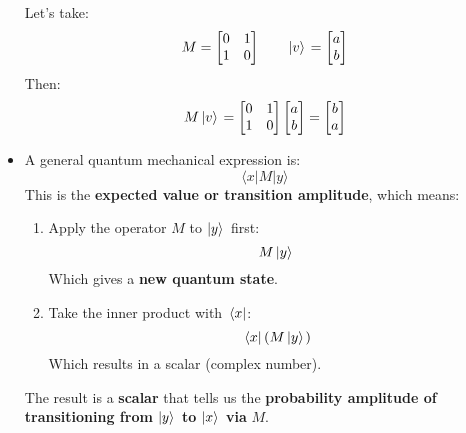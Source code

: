 \begin{itemize}
    \begin{examplebox}
        Let's take:
        \begin{equation*}
            M = \begin{bmatrix}
                0 & 1 \\ 1 & 0
            \end{bmatrix}
            \hspace{2em}
            \left| v \rangle\right. = \begin{bmatrix}
                a \\ b
            \end{bmatrix}
        \end{equation*}
        Then:
        \begin{equation*}
            M \left| v \rangle\right. = \begin{bmatrix}
                0 & 1 \\ 1 & 0
            \end{bmatrix}
            \begin{bmatrix}
                a \\ b
            \end{bmatrix}
            =
            \begin{bmatrix}
                b \\ a
            \end{bmatrix}
        \end{equation*}
    \end{examplebox}


    \item {}

    A general quantum mechanical expression is:
    \begin{equation*}
        \langle x | M | y \rangle
    \end{equation*}  
    This is the \textbf{expected value or transition amplitude}, which means:
    \begin{enumerate}
        \item Apply the operator $M$ to $\left| y \rangle\right.$ first:  
        \begin{equation*}
            M \left| y \rangle\right.
        \end{equation*}
        Which gives a \textbf{new quantum state}.
        \item Take the inner product with $\left.\langle x \right|$:  
        \begin{equation*}
            \left.\langle x \right| \left(M \left| y \rangle\right.\right)
        \end{equation*}
        Which results in a scalar (complex number).
    \end{enumerate}
    The result is a \textbf{scalar} that tells us the \textbf{probability amplitude of transitioning from} $\left| y \rangle\right.$ \textbf{to} $\left| x \rangle\right.$ \textbf{via} $M$.


\end{itemize}
